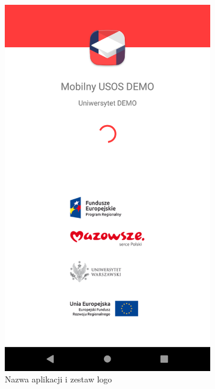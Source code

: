 \documentclass{pracamgr}
\begin{document}
\begin{figure}[p]
	\centering
	\begin{subfigure}[t]{0.3\textwidth}
		\includegraphics[width=\textwidth]{img/splash_screen.png}
		\caption{Nazwa aplikacji i zestaw logo}
		\label{fig:splash_screen}
	\end{subfigure}
	\quad
	\begin{subfigure}[t]{0.3\textwidth}

\end{subfigure}
\end{figure}
\end{document}
